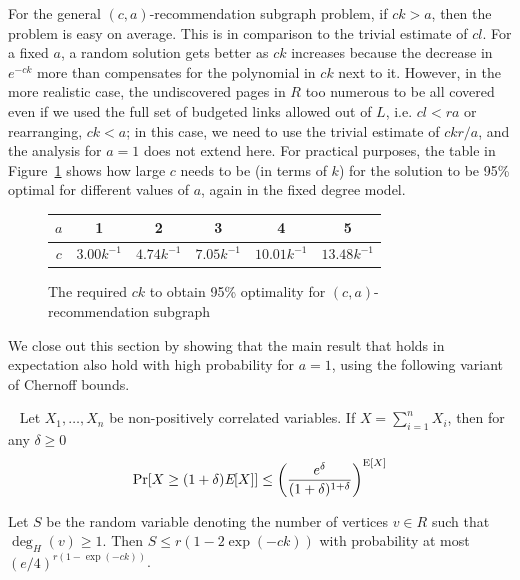 For the general $(c, a)$-recommendation subgraph problem, if $ck>a$,
then the problem is easy on average. This is in comparison to the
trivial estimate of $cl$. For a fixed $a$, a random solution gets
better as $ck$ increases because the decrease in $e^{-ck}$ more than
compensates for the polynomial in $ck$ next to it. However, in the
more realistic case, the undiscovered pages in $R$ too numerous to be all covered even if we used the full set of budgeted links allowed out of $L$, i.e. $cl < ra$ or rearranging, $ck<a$; in this case, we need to use the trivial estimate of
$ckr/a$, and the analysis for $a=1$ does not extend here. For practical purposes, the table
in Figure~\ref{a-values} shows how large $c$ needs to be (in terms of $k$) for the
solution to be 95\% optimal for different values of $a$, again in the fixed degree model.\vs

\begin{figure}[H]
  \centering
  \begin{tabular}{ |c|c|c|c|c|c| }
    \hline
    $a$ & 1 & 2 & 3 & 4 & 5 \\ \hline
    $c$ & $3.00k^{-1}$ & $4.74k^{-1}$ & $7.05k^{-1}$ & $10.01k^{-1}$ & $13.48k^{-1}$ \\
    \hline
  \end{tabular}
  \caption{The required $ck$ to obtain 95\% optimality for $(c, a)$-recommendation subgraph}
  \label{a-values}
\end{figure}


We close out this section by showing that the main result that holds
in expectation also hold with high probability for $a=1$, using the
following variant of Chernoff bounds.

\begin{thm}\label{negative_corr_chernoff}~\cite{AugerDoerr2011}
Let $X_1,\ldots, X_n$ be non-positively correlated variables. If $X=\sum_{i=1}^n X_i$, then for any $\delta\geq 0$
\[ \Pr[X \geq (1+\delta)\emph{\text{E}}[X] ] \leq \left(\frac{e^\delta}{(1+\delta)^{1+\delta}}\right)^{\text{E}[X]} \]
\end{thm}


\begin{thm}
Let $S$ be the random variable denoting the number of vertices $v \in R$ such that $\deg_{H}(v)\geq 1$. Then
$ S \leq r(1-2\exp(-ck))$ with probability at most $(e/4)^{r(1-\exp(-ck))}$.
\end{thm}

